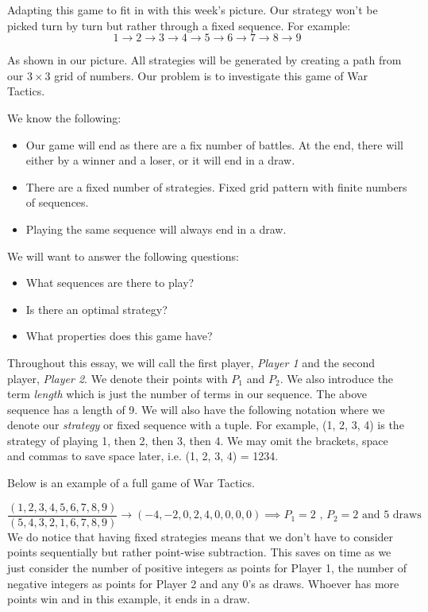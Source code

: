 \documentclass[11pt]{article}
\newcommand{\keywordfont}{\textsc}
\newcommand{\keyword}[1]{%
  \marginpar{\raggedright\small\keywordfont{#1}}}
\begin{document}
Adapting this game to fit in with this week's picture. Our strategy won't be picked turn by turn but rather through a fixed sequence. For example:
\[
1 \rightarrow 2 \rightarrow 3 \rightarrow 4 \rightarrow 5 \rightarrow 6 \rightarrow 7 \rightarrow 8 \rightarrow 9
\]

As shown in our picture. All strategies will be generated by creating a path from our $3\times3$ grid of numbers. Our problem is to investigate this game of War Tactics.

We \keyword{I know} know the following:

\begin{itemize}
    \item Our game will end as there are a fix number of battles. At the end, there will either by a winner and a loser, or it will end in a draw.
    \item There are a fixed number of strategies. Fixed grid pattern with finite numbers of sequences.
    \item Playing the same sequence will always end in a draw.
\end{itemize}

We \keyword{I want} will want to answer the following questions:
\begin{itemize}
    \item What sequences are there to play?
    \item Is there an optimal strategy?
    \item What properties does this game have? 
\end{itemize}

Throughout \keyword{Introduce} this essay, we will call the first player, \textit{Player 1} and the second player, \textit{Player 2}. We denote their points with $P_1$  and $P_2$. We also introduce the term \textit{length} which is just the number of terms in our sequence. The above sequence has a length of 9. We will also have the following notation where we denote our \textit{strategy} or fixed sequence with a tuple. For example, (1, 2, 3, 4) is the strategy of playing 1, then 2, then 3, then 4. We may omit the brackets, space and commas to save space later, i.e. (1, 2, 3, 4) = 1234.

Below is an example of a full game of War Tactics.

\[
\frac{(1, 2, 3, 4, 5, 6, 7, 8, 9)}{(5, 4, 3, 2, 1, 6, 7, 8, 9)} \rightarrow (-4, -2, 0, 2, 4, 0, 0, 0, 0) \implies P_1 = 2 \text{ , } P_2 = 2 \text{ and 5 draws}
\]
We do \keyword{AHA} notice that having fixed strategies means that we don't have to consider points sequentially but rather point-wise subtraction. This saves on time as we just consider the number of positive integers as points for Player 1, the number of negative integers as points for Player 2 and any 0's as draws. Whoever has more points win and in this example, it ends in a draw.
\end{document}

